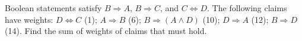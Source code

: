 Boolean statements satisfy $B\Rightarrow A$, $B\Rightarrow C$, and $C\Leftrightarrow D$. The following claims have weights: $D\Leftrightarrow C$ (1); $A\Rightarrow B$ (6); $B\Rightarrow(A\land D)$ (10); $D\Rightarrow A$ (12); $B\Rightarrow D$ (14). Find the sum of weights of claims that must hold.
